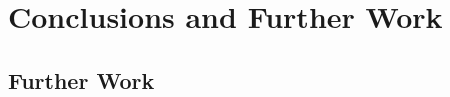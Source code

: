 
\section{Conclusions and Further Work}
\label{sec:cfw}

\subsection{Further Work}
\label{sec:cfw-fw}

